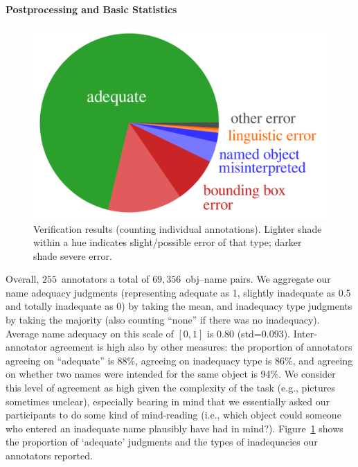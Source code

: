 \paragraph{Postprocessing and Basic Statistics}
\begin{figure}[t]
	\centering
	\hspace*{.2\columnwidth}\includegraphics[width=.7\columnwidth]{images/verification_piechart.pdf}
	\caption{Verification results (counting individual annotations). Lighter shade within a hue indicates slight/possible error of that type; darker shade severe error.}
	\label{fig:verification-piechart}
\end{figure}
%
Overall, $255$~annotators a total of $69,356$~obj--name pairs.
We aggregate our name adequacy judgments (representing adequate as 1, slightly inadequate as 0.5 and totally inadequate as 0) by taking the mean, and inadequacy type judgments by taking the majority (also counting ``none'' if there was no inadequacy). 
Average name adequacy on this scale of $[0,1]$ is 0.80 (\mbox{std=$0.093$}). 
Inter-annotator agreement is high also by other measures: the proportion of annotators agreeing on ``adequate'' is 88\%, agreeing on inadequacy type is 86\%, and agreeing on whether two names were intended for the same object is 94\%.
We consider this level of agreement as high given the complexity of the task (e.g., pictures sometimes unclear), especially bearing in mind that we essentially asked our participants to do some kind of mind-reading (i.e., which object could someone who entered an inadequate name plausibly have had in mind?).
Figure~\ref{fig:verification-piechart} shows the proportion of `adequate' judgments and the types of inadequacies our annotators reported.

